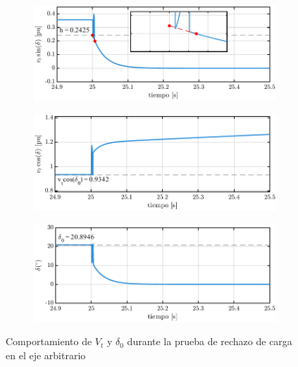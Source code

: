 \documentclass[conference]{IEEEtran}
\begin{document}
\begin{figure}[ht]
    \centering
    \begin{subfigure}
        \centering
        \includegraphics[width=\linewidth]{Fig/fig6.pdf}
        \label{fig:fig6}
    \end{subfigure}
    \hfill
    \begin{subfigure}
        \centering
        \includegraphics[width=\linewidth]{Fig/fig7.pdf}
        \label{fig:fig7}
    \end{subfigure}
    \hfill
    \begin{subfigure}
        \centering
        \includegraphics[width=\linewidth]{Fig/fig8.pdf}    
        \label{fig:fig8}
    \end{subfigure}
    \caption{Comportamiento de $V_t$ y $\delta_0$ durante la prueba de rechazo de carga en el eje arbitrario}
    \label{fig:subfigs1}
\end{figure}
\end{document}
